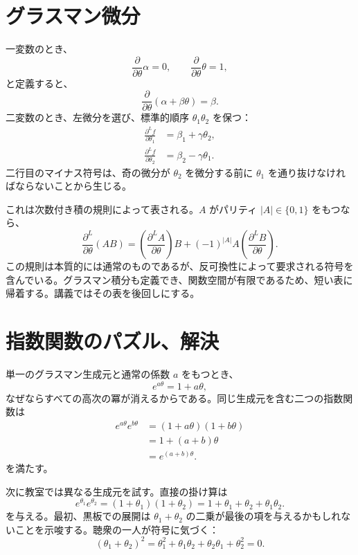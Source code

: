 \section{グラスマン微分}

一変数のとき、
\begin{equation}
\frac{\partial}{\partial\theta}\alpha=0,
\qquad
\frac{\partial}{\partial\theta}\theta=1,
\end{equation}
と定義すると、
\begin{equation}
\frac{\partial}{\partial\theta}
(\alpha+\beta\theta)=\beta.
\end{equation}
二変数のとき、左微分を選び、標準的順序 \(\theta_1\theta_2\) を保つ：
\begin{align}
\frac{\partial^L f}{\partial\theta_1}
&=\beta_1+\gamma\theta_2,\\
\frac{\partial^L f}{\partial\theta_2}
&=\beta_2-\gamma\theta_1.
\end{align}
二行目のマイナス符号は、奇の微分が \(\theta_2\) を微分する前に \(\theta_1\) を通り抜けなければならないことから生じる。

これは次数付き積の規則によって表される。\(A\) がパリティ \(|A|\in\{0,1\}\) をもつなら、
\begin{equation}
\frac{\partial^L}{\partial\theta}(AB)
=\left(\frac{\partial^L A}{\partial\theta}\right)B
+(-1)^{|A|}A
\left(\frac{\partial^L B}{\partial\theta}\right).
\end{equation}
この規則は本質的には通常のものであるが、反可換性によって要求される符号を含んでいる。グラスマン積分も定義でき、関数空間が有限であるため、短い表に帰着する。講義ではその表を後回しにする。

\section{指数関数のパズル、解決}

単一のグラスマン生成元と通常の係数 \(a\) をもつとき、
\begin{equation}
e^{a\theta}
=1+a\theta,
\end{equation}
なぜならすべての高次の冪が消えるからである。同じ生成元を含む二つの指数関数は
\begin{align}
e^{a\theta}e^{b\theta}
&=(1+a\theta)(1+b\theta)\\
&=1+(a+b)\theta\\
&=e^{(a+b)\theta}.
\end{align}
を満たす。

次に教室では異なる生成元を試す。直接の掛け算は
\begin{equation}
e^{\theta_1}e^{\theta_2}
=(1+\theta_1)(1+\theta_2)
=1+\theta_1+\theta_2+\theta_1\theta_2.
\end{equation}
を与える。最初、黒板での展開は \(\theta_1+\theta_2\) の二乗が最後の項を与えるかもしれないことを示唆する。聴衆の一人が符号に気づく：
\begin{equation}
(\theta_1+\theta_2)^2
=\theta_1^2+\theta_1\theta_2
 +\theta_2\theta_1+\theta_2^2
=0.
\end{equation}

